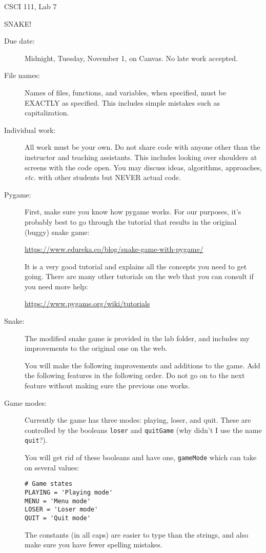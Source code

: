 \documentclass[12pt]{article}
\begin{document}
\sloppy
\centerline{\Large CSCI 111, Lab 7}
\centerline{\large SNAKE!}

\begin{description}
\item[Due date:] Midnight, Tuesday, November 1, on Canvas.
No late work accepted.  

\item[File names:]  Names of files, functions, and variables, 
when specified,
must be EXACTLY as specified.  This includes simple mistakes such
as capitalization.

\item[Individual work:]  All work must be your own.  Do not share
code with anyone other than the instructor and teaching assistants.
This includes looking over shoulders at screens with the code open.
You may discuss ideas, algorithms, approaches, {\em etc.} with
other students but NEVER actual code.

\item[Pygame:]  First, make sure you know how pygame works.
For our purposes, it's probably best to go through the 
tutorial that results in the original (buggy) snake game:

\centerline{\url{https://www.edureka.co/blog/snake-game-with-pygame/}}

It is a very good tutorial and explains all the concepts you need
to get going. There are many other tutorials on the web that you 
can consult if you need more help:
\centerline{ \url{https://www.pygame.org/wiki/tutorials}}


\item[Snake:] The modified snake game is provided in the lab folder,
and includes my improvements to the original one on the web.

You will make the following improvements and additions to the game.
Add the following features in the following order.  Do not go on
to the next feature without making sure the previous one works.

\item[Game modes:]  Currently the game has three modes: playing, loser,
and quit.  These are controlled by the booleans \lstinline{loser} and
\lstinline{quitGame} (why didn't I use the name \lstinline{quit}?).

You will get rid of these booleans and have one, \lstinline{gameMode}
which can take on several values:
\begin{lstlisting}
# Game states
PLAYING = 'Playing mode'
MENU = 'Menu mode'
LOSER = 'Loser mode'
QUIT = 'Quit mode'
\end{lstlisting}
The constants (in all caps) are easier to type than the strings,
and also make sure you have fewer spelling mistakes.


\end{description}
\end{document}
